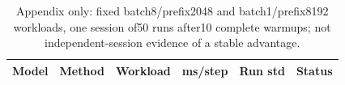 \begin{table}[t]
\centering
\small
\caption{Appendix only: fixed batch8/prefix2048 and batch1/prefix8192 workloads, one session of50 runs after10 complete warmups; not independent-session evidence of a stable advantage.}
\begin{tabular}{llllll}
\toprule
Model & Method & Workload & ms/step & Run std & Status \\
\midrule
\bottomrule
\end{tabular}
\end{table}
